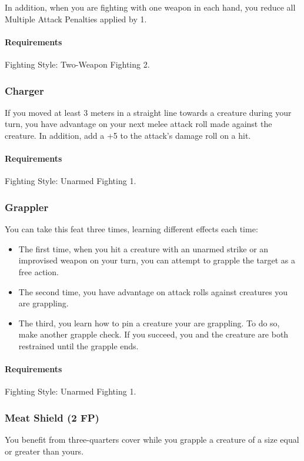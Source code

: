     In addition, when you are fighting with one weapon in each hand, you reduce all Multiple Attack Penalties applied by 1.
    \paragraph{Requirements} Fighting Style: Two-Weapon Fighting 2.
\subsubsection{Charger} \label{feat::charger}
    If you moved at least 3 meters in a straight line towards a creature during your turn, you have advantage on your next melee attack roll made against the creature.
    In addition, add a +5 to the attack's damage roll on a hit.
    \paragraph{Requirements} Fighting Style: Unarmed Fighting 1.
\subsubsection{Grappler} \label{feat::grappler}
    You can take this feat three times, learning different effects each time:
    \begin{itemize}
        \item The first time, when you hit a creature with an unarmed strike or an improvised weapon on your turn, you can attempt to grapple the target as a free action.
        \item The second time, you have advantage on attack rolls against creatures you are grappling.
        \item The third, you learn how to pin a creature your are grappling.
        To do so, make another grapple check.
        If you succeed, you and the creature are both restrained until the grapple ends.
    \end{itemize}
    \paragraph{Requirements} Fighting Style: Unarmed Fighting 1.
\subsubsection{Meat Shield (2 FP)} \label{feat::meatshield}
    You benefit from three-quarters cover while you grapple a creature of a size equal or greater than yours.

